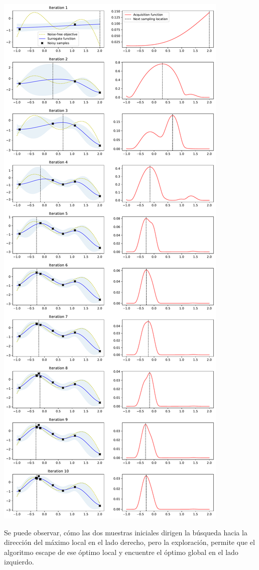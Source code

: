 \documentclass[
  12pt,
  letterpaper,
  DIV=11,
  numbers=noendperiod]{scrartcl}
\begin{document}
\includegraphics{ProyFinal_OptBayesiana_2024_files/figure-pdf/cell-6-output-1.pdf}

Se puede observar, cómo las dos muestras iniciales dirigen la búsqueda
hacia la dirección del máximo local en el lado derecho, pero la
exploración, permite que el algoritmo escape de ese óptimo local y
encuentre el óptimo global en el lado izquierdo.
\end{document}
